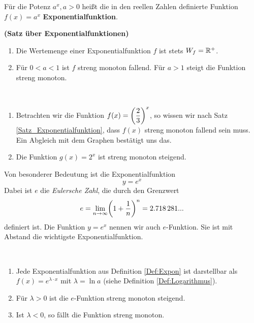 \documentclass[ngerman, 12pt]{nssheetxea}
\begin{document}
\begin{definition} Für die Potenz $a^x, a>0$ heißt die in den reellen Zahlen definierte Funktion $f(x)=a^x$ \textbf{Exponentialfunktion}.
\label{Def:Expon}
 
\end{definition}

\begin{theorem} \textbf{(Satz über Exponentialfunktionen)}
\begin{enumerate}[1.]
\item Die Wertemenge einer Exponentialfunktion $f$ ist stets $W_f=\mathbb{R}^+$. 
\item Für $0<a<1$ ist $f$ streng monoton fallend. Für $a>1$ steigt die Funktion streng monoton.
\end{enumerate}
\label{Satz_Exponentialfunktion}
\end{theorem}

\begin{example} \

\begin{enumerate}
\item Betrachten wir die Funktion $f(x)=\mleft( \dfrac{2}{3} \mright)^x$, so wissen wir nach Satz \ref{Satz_Exponentialfunktion}, dass $f(x)$ streng monoton fallend sein muss. Ein Abgleich mit dem Graphen bestätigt uns das.
\item Die Funktion $g(x)=2^x$ ist streng monoton steigend.
\end{enumerate}
\begin{center}
\end{center}
\end{example}

Von besonderer Bedeutung ist die Exponentialfunktion 
\[ y=e^x \]
Dabei ist $e$ die \textit{Eulersche Zahl}, die durch den Grenzwert 
\[
e=\lim_{n\rightarrow \infty} \mleft( 1+\dfrac{1}{n}\mright) ^n = \num{2,718281}...
\]
definiert ist. Die Funktion $y=e^x$ nennen wir auch $e$-Funktion. Sie ist mit Abstand die wichtigste Exponentialfunktion. 
\begin{theorem} \
\begin{enumerate}
\item Jede Exponentialfunktion aus Definition \ref{Def:Expon} ist darstellbar als $f(x)=e^{\lambda\cdot x}$ mit $\lambda = \ln a$ (siehe Definition \ref{Def:Logarithmus}). 
\item Für $\lambda > 0$ ist die $e$-Funktion streng monoton steigend.
\item Ist $\lambda < 0$, so fällt die Funktion streng monoton. 
\end{enumerate}
\end{theorem}
\end{document}
